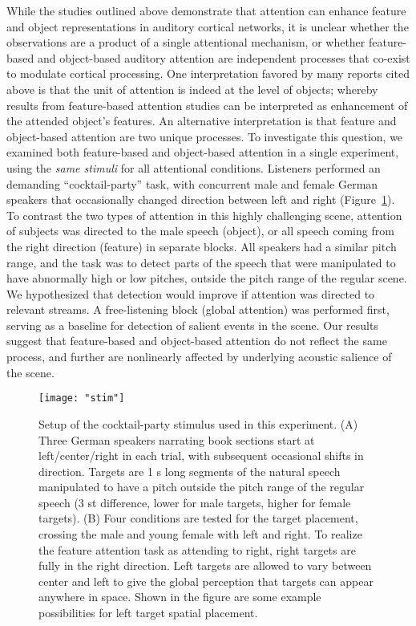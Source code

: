 \documentclass[9pt,twocolumn,twoside]{pnas-new}
\begin{document}
While the studies outlined above demonstrate that attention can enhance feature and object representations in auditory cortical networks, it is unclear whether the observations are a product of a single attentional mechanism, or whether feature-based and object-based auditory attention are independent processes that co-exist to modulate cortical processing. One interpretation favored by many reports cited above is that the unit of attention is indeed at the level of objects; whereby results from feature-based attention studies can be interpreted as enhancement of the attended object's features. An alternative interpretation is that feature and object-based attention are two unique processes. To investigate this question, we examined both feature-based and object-based attention in a single experiment, using the \emph{same stimuli} for all attentional conditions. Listeners performed an demanding ``cocktail-party'' task, with concurrent male and female German speakers that occasionally changed direction between left and right (Figure~\ref{fig:attn_stim}). To contrast the two types of attention in this highly challenging scene, attention of subjects was directed to the male speech (object), or all speech coming from the right direction (feature) in separate blocks. All speakers had a similar pitch range, and the task was to detect parts of the speech that were manipulated to have abnormally high or low pitches, outside the pitch range of the regular scene. We hypothesized that detection would improve if attention was directed to relevant streams. A free-listening block (global attention) was performed first, serving as a baseline for detection of salient events in the scene. Our results suggest that feature-based and object-based attention do not reflect the same process, and further are nonlinearly affected by underlying acoustic salience of the scene.

\begin{figure}[t]
\centering
\texttt{[image: "stim"]}
\caption[Cocktail-party stimulus design to probe selective attention.]{Setup of the cocktail-party stimulus used in this experiment. (A) Three German speakers narrating book sections start at left/center/right in each trial, with subsequent occasional shifts in direction. Targets are 1 s long segments of the natural speech manipulated to have a pitch outside the pitch range of the regular speech (3 st difference, lower for male targets, higher for female targets). (B) Four conditions are tested for the target placement, crossing the male and young female with left and right. To realize the feature attention task as attending to right, right targets are fully in the right direction. Left targets are allowed to vary between center and left to give the global perception that targets can appear anywhere in space. Shown in the figure are some example possibilities for left target spatial placement.}
\label{fig:attn_stim}
\end{figure}
\end{document}
